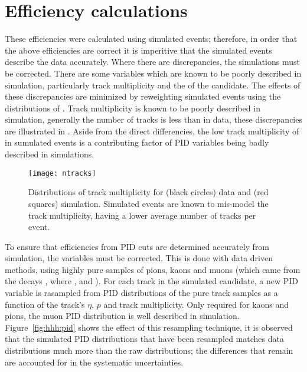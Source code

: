 \section{Efficiency calculations}
\label{sec:hhh:eff}


These efficiencies were calculated using simulated events; therefore, in order that the above
efficiencies are correct it is imperitive that the simulated events describe the data accurately.
Where there are discrepancies, the simulations must be corrected.
There are some variables which are known to be poorly described in simulation, particularly track
multiplicity and the \chisqvtx of the \Bp candidate.
The effects of these discrepancies are minimized by reweighting simulated events using
the distributions of \btojpsikpipi.
Track multiplicity is known to be poorly described in simulation, generally the number of tracks is
less than in data, these discrepancies are illustrated in .
Aside from the direct differencies, the low track multiplicity of in sumulated events is a
contributing factor of PID variables being badly described in simulations.

\begin{figure}
  \begin{center}
    \texttt{[image: ntracks]}
    \caption[Differences between track multiplicity in data and simulation]
    {\small
      Distributions of track multiplicity for (black circles) data and (red squares) simulation.
      Simulated events are known to mis-model the track multiplicity, having a lower average number
      of tracks per event.
    }
    \label{fig:hhh:ntracks}
  \end{center}
\end{figure}

To ensure that efficiencies from PID cuts are determined accurately from simulation, the variables
must be corrected.
This is done with data driven methods, using highly pure samples of pions, kaons
and muons (which came from the decays \decay{\Dstarp}{\Dz\pip}, where \decay{\Dz}{\Km\pip}, and
\jpsitomumu).
For each track in the simulated \Bp candidate, a new PID variable is rasampled from PID
distributions of the pure track samples as a function of the track's $\eta$, $p$ and track
multiplicity.
Only required for kaons and pions, the muon PID distribution is well described in simulation.
Figure~\ref{fig:hhh:pid} shows the effect of this resampling technique, it is observed that the
simulated PID distributions that have been resampled matches data distributions much more than the
raw distributions; the differences that remain are accounted for in the systematic uncertainties.

